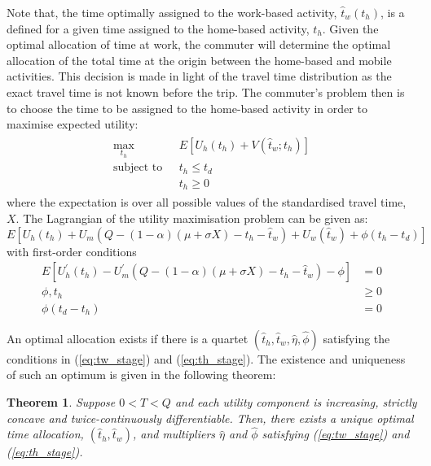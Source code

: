 \documentclass[12pt,a4paper,british]{article}
\newtheorem{theorem}{Theorem}[section]
\begin{document}
Note that, the time optimally assigned to the work-based activity, $\hat{t}_w(t_h)$, is a defined for a given time assigned to the home-based activity, $t_h$. Given the optimal allocation of time at work, the commuter will determine the optimal allocation of the total time at the origin between the home-based and mobile activities. This decision is made in light of the travel time distribution as the exact travel time is not known before the trip. The commuter's problem then is to choose the time to be assigned to the home-based activity in order to maximise expected utility:
\begin{align}
\begin{split}
\max_{t_{h}} \quad & E\left[U_{h}\left(t_{h}\right)+V\left(\hat{t}_{w};t_{h}\right)\right]\\
\mbox{subject to } \,\, & t_{h} \leq t_{d} \\
& t_h \geq 0
\end{split}
\label{eq:firstStageProblem}
\end{align}
where the expectation is over all possible values of the standardised travel time, $X$. The Lagrangian of the utility maximisation problem can be given as: 
\begin{equation*}
E\left[U_{h}\left(t_{h}\right)+U_{m}\left(Q-\left(1-\alpha\right)\left(\mu+\sigma X\right)-t_{h}-\hat{t}_{w}\right)+U_{w}\left(\hat{t}_{w}\right)+\phi\left(t_{h}-t_{d}\right)\right]
\end{equation*}
with first-order conditions
\begin{subequations}\label{eq:th_stage}
\begin{align}
E\left[U_{h}^{\prime}\left(t_{h}\right)-U_{m}^{\prime}\left(Q-\left(1-\alpha\right)\left(\mu+\sigma X\right)-t_{h}-\hat{t}_{w}\right)-\phi\right] & =0
\label{eq:stage1_wrt_th}\\
\phi,t_{h} & \geq 0 
\label{eq:stage1_lambda}\\
\phi\left(t_{d}-t_{h}\right) & =0
\label{eq:stage1_lambdai_const}
\end{align}
\end{subequations}

An optimal allocation exists if there is a quartet $\left(\hat{t}_{h},\hat{t}_{w},\hat{\eta},\hat{\phi}\right)$ satisfying the conditions in (\ref{eq:tw_stage}) and (\ref{eq:th_stage}). The existence and uniqueness of such an optimum is given in the following theorem:
\begin{theorem}
\label{thm:existence_stochastic}
Suppose $0<T<Q$ and each utility component is increasing, strictly concave and twice-continuously differentiable. Then, there exists a unique optimal time allocation, $\left(\hat{t}_{h},\hat{t}_{w}\right)$, and multipliers $\hat{\eta}$ and $\hat{\phi}$ satisfying (\ref{eq:tw_stage}) and (\ref{eq:th_stage}).
\end{theorem}
\end{document}
